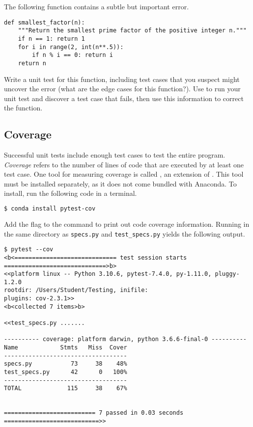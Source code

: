 \begin{problem} %
The following function contains a subtle but important error.
\begin{lstlisting}
def smallest_factor(n):
    """Return the smallest prime factor of the positive integer n."""
    if n == 1: return 1
    for i in range(2, int(n**.5)):
        if n % i == 0: return i
    return n
\end{lstlisting}
Write a unit test for this function, including test cases that you suspect might uncover the error (what are the edge cases for this function?).
Use  to run your unit test and discover a test case that fails, then use this information to correct the function.
\label{prob:unittest_intro}
\end{problem}

\subsection*{Coverage} %

Successful unit tests include enough test cases to test the entire program.
\emph{Coverage} refers to the number of lines of code that are executed by at least one test case.
One tool for measuring coverage is called , an extension of .
This tool must be installed separately, as it does not come bundled with Anaconda. 
To install, run the following code in a terminal.

\begin{lstlisting}[language=bash]
$ conda install pytest-cov
\end{lstlisting}

Add the flag  to the  command to print out code coverage information.
Running  in the same directory as \texttt{specs.py} and \texttt{test\_specs.py} yields the following output.

\begin{lstlisting}
$ pytest --cov
<b<============================= test session starts =============================>b>
<<platform linux -- Python 3.10.6, pytest-7.4.0, py-1.11.0, pluggy-1.2.0
rootdir: /Users/Student/Testing, inifile:
plugins: cov-2.3.1>>
<b<collected 7 items>b>

<<test_specs.py .......

---------- coverage: platform darwin, python 3.6.6-final-0 ----------
Name            Stmts   Miss  Cover
-----------------------------------
specs.py           73     38    48%
test_specs.py      42      0   100%
-----------------------------------
TOTAL             115     38    67%


========================== 7 passed in 0.03 seconds ===========================>>\end{lstlisting}

